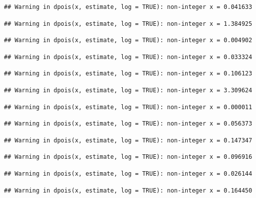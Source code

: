 \documentclass[]{article}
\begin{document}
\begin{verbatim}
## Warning in dpois(x, estimate, log = TRUE): non-integer x = 0.041633
\end{verbatim}

\begin{verbatim}
## Warning in dpois(x, estimate, log = TRUE): non-integer x = 1.384925
\end{verbatim}

\begin{verbatim}
## Warning in dpois(x, estimate, log = TRUE): non-integer x = 0.004902
\end{verbatim}

\begin{verbatim}
## Warning in dpois(x, estimate, log = TRUE): non-integer x = 0.033324
\end{verbatim}

\begin{verbatim}
## Warning in dpois(x, estimate, log = TRUE): non-integer x = 0.106123
\end{verbatim}

\begin{verbatim}
## Warning in dpois(x, estimate, log = TRUE): non-integer x = 3.309624
\end{verbatim}

\begin{verbatim}
## Warning in dpois(x, estimate, log = TRUE): non-integer x = 0.000011
\end{verbatim}

\begin{verbatim}
## Warning in dpois(x, estimate, log = TRUE): non-integer x = 0.056373
\end{verbatim}

\begin{verbatim}
## Warning in dpois(x, estimate, log = TRUE): non-integer x = 0.147347
\end{verbatim}

\begin{verbatim}
## Warning in dpois(x, estimate, log = TRUE): non-integer x = 0.096916
\end{verbatim}

\begin{verbatim}
## Warning in dpois(x, estimate, log = TRUE): non-integer x = 0.026144
\end{verbatim}

\begin{verbatim}
## Warning in dpois(x, estimate, log = TRUE): non-integer x = 0.164450
\end{verbatim}
\end{document}
